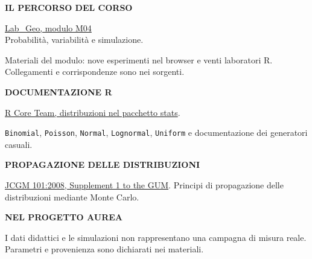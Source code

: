 \documentclass[12pt,aspectratio=1610]{beamer}
\newcommand{\PLabel}[1]{\par{\color{Classical}\bfseries\fontsize{9}{11}\selectfont\MakeUppercase{#1}}\par\vspace{1.8mm}}
\newcommand{\PBody}[1]{\par{\fontsize{11.3}{14.8}\selectfont #1\par}}
\newcommand{\PSmall}[1]{\par{\fontsize{9.8}{13.1}\selectfont #1\par}}
\begin{document}
\begin{lrbox}{\PilotLeftBox}%
\begin{minipage}[t]{10.05cm}\raggedright\color{Ink}\fontsize{11.3}{14.8}\selectfont

\PLabel{Il percorso del corso}
\PBody{\href{https://marzione00.github.io/Lab_Geo/}{Lab\_Geo, modulo M04}\\Probabilità, variabilità e simulazione.}
\vspace{2mm}
\PSmall{Materiali del modulo: nove esperimenti nel browser e venti laboratori R. Collegamenti e corrispondenze sono nei sorgenti.}
\vspace{4mm}
\PLabel{Documentazione R}
\PBody{\href{https://stat.ethz.ch/R-manual/R-devel/library/stats/html/Distributions.html}{R Core Team, distribuzioni nel pacchetto stats}.}
\PSmall{\texttt{Binomial}, \texttt{Poisson}, \texttt{Normal}, \texttt{Lognormal}, \texttt{Uniform} e documentazione dei generatori casuali.}
\vspace{4mm}
\PLabel{Propagazione delle distribuzioni}
\PSmall{\href{https://www.bipm.org/documents/20126/2071204/JCGM_101_2008_E.pdf}{JCGM 101:2008, Supplement 1 to the GUM}. Principi di propagazione delle distribuzioni mediante Monte Carlo.}

\end{minipage}%
\end{lrbox}
\begin{lrbox}{\PilotRightBox}%
\begin{minipage}[t]{7.55cm}\raggedright\color{Ink}\fontsize{11.3}{14.8}\selectfont

\PLabel{Nel progetto Aurea}
\PSmall{I dati didattici e le simulazioni non rappresentano una campagna di misura reale. Parametri e provenienza sono dichiarati nei materiali.}

\end{minipage}%
\end{lrbox}
\end{document}
